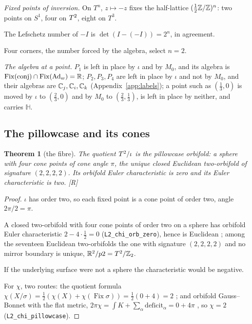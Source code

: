\documentclass[11pt,a4paper]{article}
\theoremstyle{plain}
\newtheorem{theorem}{Theorem}[section]
\theoremstyle{definition}
\theoremstyle{remark}
\newcommand{\Hquat}{\mathbb{H}}
\newcommand{\Ad}{\operatorname{Ad}}
\newcommand{\Fix}{\operatorname{Fix}}
\newcommand{\rigR}{[\textup{R}]}
\begin{document}
\emph{Fixed points of inversion.} On $T^{n}$, $z\mapsto-z$ fixes the half-lattice $(\tfrac12\mathbb{Z}/\mathbb{Z})^{n}$: two points on $S^{1}$, four on $T^2$, eight on $T^{3}$.

The Lefschetz number of $-I$ is $\det(I-(-I))=2^{n}$, in agreement.

Four corners, the number forced by the algebra, select $n=2$.

\emph{The algebra at a point.} $P_{1}$ is left in place by $\iota$ and by $M_{0}$, and its algebra is $\Fix(\text{conj})\cap\Fix(\Ad_{w})=\R$; $P_{2},P_{3},P_{4}$ are left in place by $\iota$ and not by $M_{0}$, and their algebras are $\mathbb{C}_{j},\mathbb{C}_{i},\mathbb{C}_{k}$ (Appendix~\ref{app:labels}); a point such as $(\tfrac13,0)$ is moved by $\iota$ to $(\tfrac23,0)$ and by $M_{0}$ to $(\tfrac23,\tfrac13)$, is left in place by neither, and carries $\Hquat$.

\subsection{The pillowcase and its cones}

\begin{theorem}[the fibre]\label{thm:fibre}
The quotient $T^2/\iota$ is the pillowcase orbifold: a sphere with four cone points of cone angle $\pi$, the unique closed Euclidean two-orbifold of signature $(2,2,2,2)$. Its orbifold Euler characteristic is zero and its Euler characteristic is two. \rigR
\end{theorem}

\begin{proof}
$\iota$ has order two, so each fixed point is a cone point of order two, angle $2\pi/2=\pi$.

A closed two-orbifold with four cone points of order two on a sphere has orbifold Euler characteristic $2-4\cdot\tfrac12=0$ (\texttt{L2\_chi\_orb\_zero}), hence is Euclidean \cite{Thurston}; among the seventeen Euclidean two-orbifolds the one with signature $(2,2,2,2)$ and no mirror boundary is unique, $\mathbb{R}^{2}/p2=T^2/\mathbb{Z}_2$.

If the underlying surface were not a sphere the characteristic would be negative.

For $\chi$, two routes: the quotient formula $\chi(X/\sigma)=\tfrac12(\chi(X)+\chi(\Fix\sigma))=\tfrac12(0+4)=2$ \cite{Bredon}; and orbifold Gauss--Bonnet with the flat metric, $2\pi\chi=\int K+\sum_{\alpha}\mathrm{deficit}_{\alpha}=0+4\pi$ \cite{Satake}, so $\chi=2$ (\texttt{L2\_chi\_pillowcase}).
\end{proof}
\end{document}
